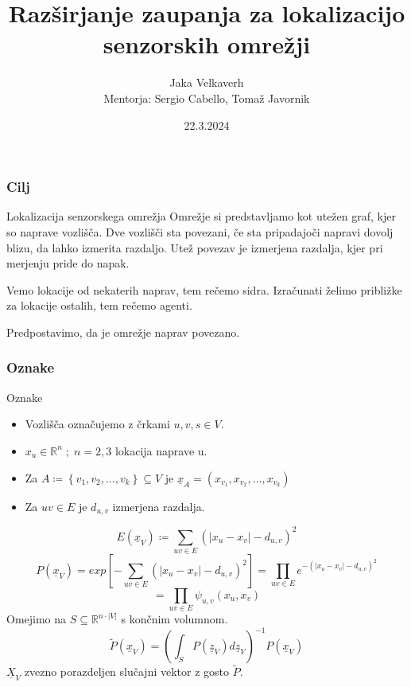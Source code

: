 \documentclass{beamer}
\title[Razširjanje zaupanja]{Razširjanje zaupanja za lokalizacijo senzorskih omrežji}
\author[Jaka Velkaverh]{Jaka Velkaverh\\Mentorja: Sergio Cabello, Tomaž Javornik}
\date{22.3.2024}
\renewcommand{\vec}{\underline}
\theoremstyle{definition}
\begin{document}
	\frame{\titlepage}

	\begin{frame}
		\frametitle{Cilj}
		\begin{block}{Lokalizacija senzorskega omrežja}
			Omrežje si predstavljamo kot utežen graf, kjer so naprave vozlišča.
			Dve vozlišči sta povezani, če sta pripadajoči napravi dovolj blizu,
			da lahko izmerita razdaljo. Utež povezav je izmerjena razdalja,
			kjer pri merjenju pride do napak.

			Vemo lokacije od nekaterih naprav, tem rečemo sidra. Izračunati
			želimo približke za lokacije ostalih, tem rečemo agenti.
		\end{block}
		Predpostavimo, da je omrežje naprav povezano.
	\end{frame}

	\begin{frame}
		\frametitle{Oznake}
		Oznake
		\begin{itemize}
			\item Vozlišča označujemo z črkami $u, v, s \in V$.
			\item $x_u \in \mathbb{R}^n\;;\;n=2, 3$ lokacija naprave u.
			\item Za $A \coloneqq \left\{v_1, v_2, \ldots, v_k\right\} \subseteq V$ je
				$\vec{x}_A = \left(x_{v_1}, x_{v_2}, \ldots, x_{v_k}\right)$
			\item Za $uv \in E$ je $d_{u,v}$ izmerjena razdalja.
		\end{itemize}
	\end{frame}

	\begin{frame}
		$$E\left(\vec{x}_V\right) \coloneqq \sum_{uv \in E}\left(\left|x_u - x_v\right|-d_{u,v}\right)^2$$
		\pause
		$$P\left(\vec{x}_V\right) = exp\left[-\sum_{uv \in E}\left(\left|x_u - x_v\right|-d_{u,v}\right)^2\right] =
		\prod_{uv \in E}e^{-\left(\left|x_u - x_v\right|-d_{u,v}\right)^2}$$
		$$
		= \prod_{uv \in E}\psi_{u,v}\left(x_u,x_v\right)
		$$
		\pause
		Omejimo na $S \subseteq \mathbb{R}^{n\cdot \left|V\right|}$ s končnim volumnom.
		$$\tilde{P}\left(\vec{x}_V\right) = \left(\int_S P\left(\vec{z}_V\right)d\vec{z}_V\right)^{-1}
		P\left(\vec{x}_V\right)$$
		\pause
		$\vec{X}_V$ zvezno porazdeljen slučajni vektor z gosto $\tilde{P}$.
	\end{frame}
\end{document}
